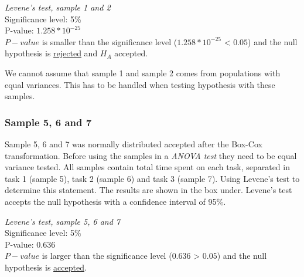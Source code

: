  \begin{center}
	\begin{tcolorbox}[width=0.8\textwidth]
		\centering
		\textit{Levene's test, sample 1 and 2}\\
		Significance level: 5\%  \\[0.5cm]
		
		P-value: $1.258 * 10^{-25}$\\[0.2cm]
		
		$P-value$ is smaller than the significance level ($1.258*10^{-25}$ < $0.05$) and the null hypothesis is \underline{rejected} and $H_A$ accepted.\\[0.5cm]
	\end{tcolorbox} 
\end{center}
\vspace{0.3cm}
We cannot assume that sample 1 and sample 2 comes from populations with equal variances. This has to be handled when testing hypothesis with these samples.

\subsubsection{Sample 5, 6 and 7}\label{sec:sample5,6,7}
Sample 5, 6 and 7 was normally distributed accepted after the Box-Cox transformation. Before using the samples in a \textit{ANOVA test} they need to be equal variance tested. All samples contain total time spent on each task, separated in task 1 (sample 5), task 2 (sample 6) and task 3 (sample 7). Using Levene's test to determine this statement. The results are shown in the box under. Levene's test accepts the null hypothesis with a confidence interval of 95\%. \\[0.2cm]

 \begin{center}
	\begin{tcolorbox}[width=0.8\textwidth]
		\centering
		\textit{Levene's test, sample 5, 6 and 7}\\
		Significance level: 5\%  \\[0.5cm]
		
		P-value: $0.636$\\[0.2cm]
		
		$P-value$ is larger than the significance level ($0.636$ > $0.05$) and the null hypothesis is \underline{accepted}.\\[0.5cm]
	\end{tcolorbox} 
\end{center}

